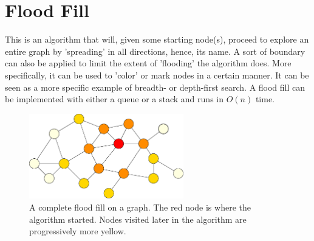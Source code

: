 \section{Flood Fill}

This is an algorithm that will, given some starting node(s), proceed to explore an entire graph by 'spreading' in all directions, hence, its name.
A sort of boundary can also be applied to limit the extent of 'flooding' the algorithm does.
More specifically, it can be used to 'color' or mark nodes in a certain manner.
It can be seen as a more specific example of breadth- or depth-first search.
A flood fill can be implemented with either a queue or a stack and runs in $O(n)$ time.

\begin{figure}[h]
    \centering
    \includegraphics[width=0.6\textwidth]{./algorithms/flood-fill/partial-ff}
    \caption{\small A complete flood fill on a graph.
      The red node is where the algorithm started.
      Nodes visited later in the algorithm are progressively more yellow.}
\end{figure}
